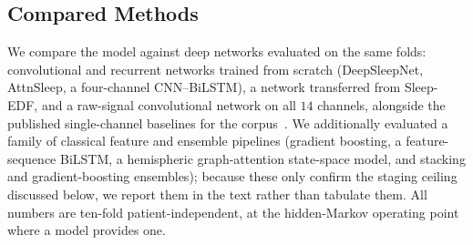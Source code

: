 \documentclass[preprint,12pt]{elsarticle}
\begin{document}
\subsection{Compared Methods}
We compare the model against deep networks evaluated on the same folds: convolutional and
recurrent networks trained from scratch (DeepSleepNet, AttnSleep, a four-channel CNN--BiLSTM), a
network transferred from Sleep-EDF, and a raw-signal convolutional network on all $14$ channels,
alongside the published single-channel baselines for the corpus~\cite{maiti2026isleeps}. We
additionally evaluated a family of classical feature and ensemble pipelines (gradient boosting,
a feature-sequence BiLSTM, a hemispheric graph-attention state-space model, and stacking and
gradient-boosting ensembles); because these only confirm the staging ceiling discussed below,
we report them in the text rather than tabulate them. All numbers are ten-fold
patient-independent, at the hidden-Markov operating point where a model provides one.
\end{document}
